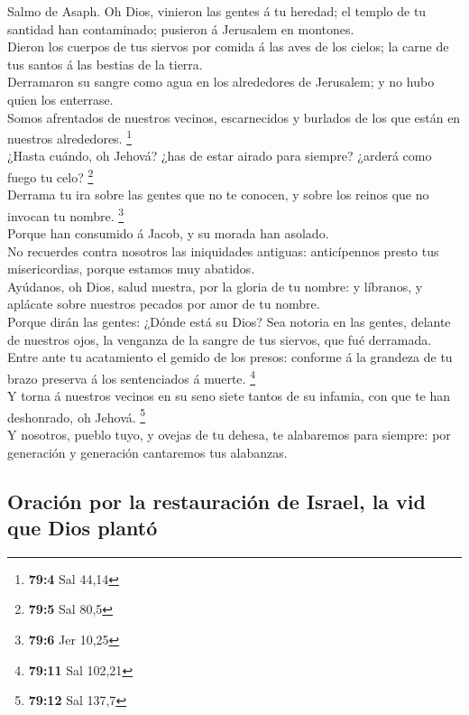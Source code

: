  Salmo de Asaph. Oh Dios, vinieron las gentes á tu heredad;
el templo de tu santidad han contaminado; pusieron á Jerusalem en
montones.\\
 Dieron los cuerpos de tus siervos por comida á las aves de
los cielos; la carne de tus santos á las bestias de la tierra.\\
 Derramaron su sangre como agua en los alrededores de
Jerusalem; y no hubo quien los enterrase.\\
 Somos afrentados de nuestros vecinos, escarnecidos y
burlados de los que están en nuestros alrededores. \footnote{\textbf{79:4}
  Sal 44,14}\\
 ¿Hasta cuándo, oh Jehová? ¿has de estar airado para
siempre? ¿arderá como fuego tu celo? \footnote{\textbf{79:5} Sal 80,5}\\
 Derrama tu ira sobre las gentes que no te conocen, y sobre
los reinos que no invocan tu nombre. \footnote{\textbf{79:6} Jer 10,25}\\
 Porque han consumido á Jacob, y su morada han asolado.\\
 No recuerdes contra nosotros las iniquidades antiguas:
anticípennos presto tus misericordias, porque estamos muy abatidos.\\
 Ayúdanos, oh Dios, salud nuestra, por la gloria de tu
nombre: y líbranos, y aplácate sobre nuestros pecados por amor de tu
nombre.\\
 Porque dirán las gentes: ¿Dónde está su Dios? Sea notoria
en las gentes, delante de nuestros ojos, la venganza de la sangre de tus
siervos, que fué derramada.\\
 Entre ante tu acatamiento el gemido de los presos:
conforme á la grandeza de tu brazo preserva á los sentenciados á muerte.
\footnote{\textbf{79:11} Sal 102,21}\\
 Y torna á nuestros vecinos en su seno siete tantos de su
infamia, con que te han deshonrado, oh Jehová. \footnote{\textbf{79:12}
  Sal 137,7}\\
 Y nosotros, pueblo tuyo, y ovejas de tu dehesa, te
alabaremos para siempre: por generación y generación cantaremos tus
alabanzas.

\hypertarget{oraciuxf3n-por-la-restauraciuxf3n-de-israel-la-vid-que-dios-plantuxf3}{%
\subsection{Oración por la restauración de Israel, la vid que Dios
plantó}\label{oraciuxf3n-por-la-restauraciuxf3n-de-israel-la-vid-que-dios-plantuxf3}}

